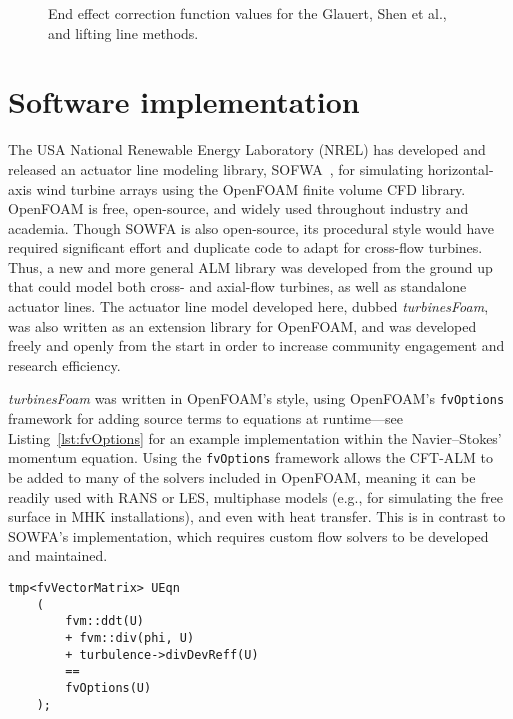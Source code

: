 \begin{figure}
    \centering
    
    \caption{End effect correction function values for the Glauert, Shen et al.,
        and lifting line methods.}
    
    \label{fig:end-effects}
\end{figure}


\section{Software implementation}

The USA National Renewable Energy Laboratory (NREL) has developed and released
an actuator line modeling library, SOFWA~\cite{Churchfield2014b}, for simulating
horizontal-axis wind turbine arrays using the OpenFOAM finite volume CFD
library. OpenFOAM is free, open-source, and widely used throughout industry and
academia. Though SOWFA is also open-source, its procedural style would have
required significant effort and duplicate code to adapt for cross-flow turbines.
Thus, a new and more general ALM library was developed from the ground up that
could model both cross- and axial-flow turbines, as well as standalone actuator
lines. The actuator line model developed here, dubbed \textit{turbinesFoam}, was
also written as an extension library for OpenFOAM, and was developed freely and
openly from the start in order to increase community engagement and research
efficiency.

\textit{turbinesFoam} was written in OpenFOAM's style, using OpenFOAM's
\texttt{fvOptions} framework for adding source terms to equations at
runtime---see Listing~\ref{lst:fvOptions} for an example implementation within
the Navier--Stokes' momentum equation. Using the \texttt{fvOptions} framework
allows the CFT-ALM to be added to many of the solvers included in OpenFOAM,
meaning it can be readily used with RANS or LES, multiphase models (e.g., for
simulating the free surface in MHK installations), and even with heat transfer.
This is in contrast to SOWFA's implementation, which requires custom flow
solvers to be developed and maintained.

\begin{lstlisting}[float,caption=Adding source terms to the momentum equation in OpenFOAM.,label=lst:fvOptions]
    tmp<fvVectorMatrix> UEqn
    (
        fvm::ddt(U)
        + fvm::div(phi, U)
        + turbulence->divDevReff(U)
        ==
        fvOptions(U)
    );
\end{lstlisting}

